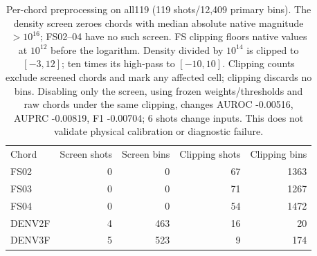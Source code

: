 \begin{table}[t]
\centering
\small
\begin{tabular}{lrrrr}
\toprule
Chord & Screen shots & Screen bins & Clipping shots & Clipping bins \\
FS02 & 0 & 0 & 67 & 1363 \\
FS03 & 0 & 0 & 71 & 1267 \\
FS04 & 0 & 0 & 54 & 1472 \\
DENV2F & 4 & 463 & 16 & 20 \\
DENV3F & 5 & 523 & 9 & 174 \\
\bottomrule
\end{tabular}\caption{Per-chord preprocessing on all119 (119 shots/12,409 primary bins). The density screen zeroes chords with median absolute native magnitude $>10^{16}$; FS02--04 have no such screen. FS clipping floors native values at $10^{12}$ before the logarithm. Density divided by $10^{14}$ is clipped to $[-3,12]$; ten times its high-pass to $[-10,10]$. Clipping counts exclude screened chords and mark any affected cell; clipping discards no bins. Disabling only the screen, using frozen weights/thresholds and raw chords under the same clipping, changes AUROC -0.00516, AUPRC -0.00819, F1 -0.00704; 6 shots change inputs. This does not validate physical calibration or diagnostic failure.}
\label{tab:elm-rejection}
\end{table}
